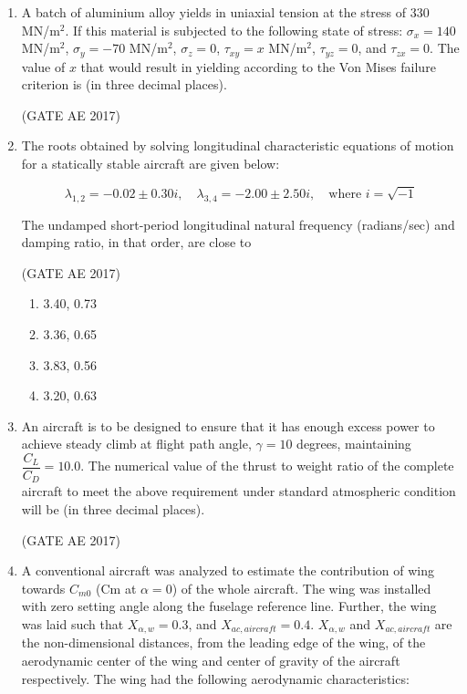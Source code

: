 \documentclass[journal,12pt,onecolumn]{IEEEtran}
\theoremstyle{remark}
\begin{document}
\begin{flushleft}
\begin{enumerate}
\item A batch of aluminium alloy yields in uniaxial tension at the stress of 330 MN/m$^2$. If this material is subjected to the following state of stress: $\sigma_x = 140$ MN/m$^2$, $\sigma_y = -70$ MN/m$^2$, $\sigma_z = 0$, $\tau_{xy} = x$ MN/m$^2$, $\tau_{yz} = 0$, and $\tau_{zx} = 0$. The value of $x$ that would result in yielding according to the Von Mises failure criterion is \underline{\hspace{2cm}} (in three decimal places).  

\hfill (GATE AE 2017)  

\item The roots obtained by solving longitudinal characteristic equations of motion for a statically stable aircraft are given below:  

\[
\lambda_{1,2} = -0.02 \pm 0.30i, \quad \lambda_{3,4} = -2.00 \pm 2.50i, \quad \text{where } i = \sqrt{-1}
\]

The undamped short-period longitudinal natural frequency (radians/sec) and damping ratio, in that order, are close to  

\hfill (GATE AE 2017)  

\begin{enumerate}
\item 3.40, 0.73  
\item 3.36, 0.65  
\item 3.83, 0.56  
\item 3.20, 0.63  
\end{enumerate}
\item An aircraft is to be designed to ensure that it has enough excess power to achieve steady climb at flight path angle, $\gamma = 10$ degrees, maintaining $\dfrac{C_L}{C_D} = 10.0$. The numerical value of the thrust to weight ratio of the complete aircraft to meet the above requirement under standard atmospheric condition will be \underline{\hspace{2cm}} (in three decimal places).  

\hfill (GATE AE 2017)  

\item A conventional aircraft was analyzed to estimate the contribution of wing towards $C_{m0}$ (Cm at $\alpha = 0$) of the whole aircraft. The wing was installed with zero setting angle along the fuselage reference line. Further, the wing was laid such that $X_{\alpha,w} = 0.3$, and $X_{ac,aircraft} = 0.4$. $X_{\alpha,w}$ and $X_{ac,aircraft}$ are the non-dimensional distances, from the leading edge of the wing, of the aerodynamic center of the wing and center of gravity of the aircraft respectively. The wing had the following aerodynamic characteristics:  


\end{enumerate}
\end{flushleft}
\end{document}
